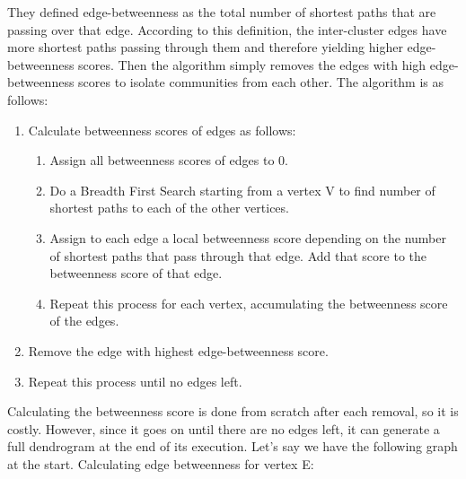 \documentclass[10pt]{article}
\begin{document}
They defined edge-betweenness as the total number of shortest paths that are passing over that edge. According to this definition, the inter-cluster edges have more shortest paths passing through them and therefore yielding higher edge-betweenness scores. Then the algorithm simply removes the edges with high edge-betweenness scores to isolate communities from each other\cite{raghavan}. The algorithm is as follows: \\

\begin{enumerate}
\item Calculate betweenness scores of edges as follows:
\begin{enumerate}
\item Assign all betweenness scores of edges to 0.
\item Do a Breadth First Search starting from a vertex V to find number of shortest paths to each of the other vertices.
\item Assign to each edge a local betweenness score depending on the number of shortest paths that pass through that edge. Add that score to the betweenness score of that edge.
\item Repeat this process for each vertex, accumulating the betweenness score of the edges.
\end{enumerate}
\item Remove the edge with highest edge-betweenness score.
\item Repeat this process until no edges left.
\end{enumerate}

Calculating the betweenness score is done from scratch after each removal, so it is costly. However, since it goes on until there are no edges left, it can generate a full dendrogram at the end of its execution. Let’s say we have the following graph at the start. Calculating edge betweenness for vertex E:

\vspace{15ex}

\begin{figure}
    \centering
    \qquad
\end{figure}
\end{document}
